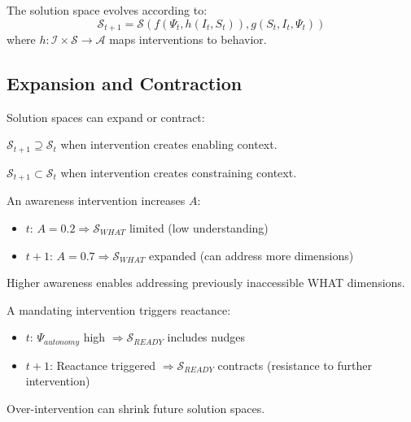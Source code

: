 \begin{theorem}
The solution space evolves according to:
\begin{equation}
\mathcal{S}_{t+1} = \mathcal{S}\left(f(\Psi_t, h(I_t, S_t)), g(S_t, I_t, \Psi_t)\right)
\end{equation}
where $h: \mathcal{I} \times \mathcal{S} \to \mathcal{A}$ maps interventions to behavior.
\end{theorem}

\subsection{Expansion and Contraction}

Solution spaces can expand or contract:

\begin{definition}
$\mathcal{S}_{t+1} \supseteq \mathcal{S}_t$ when intervention creates enabling context.
\end{definition}

\begin{definition}
$\mathcal{S}_{t+1} \subset \mathcal{S}_t$ when intervention creates constraining context.
\end{definition}

\begin{example}
An awareness intervention increases $A$:
\begin{itemize}
    \item $t$: $A = 0.2 \Rightarrow \mathcal{S}_{WHAT}$ limited (low understanding)
    \item $t+1$: $A = 0.7 \Rightarrow \mathcal{S}_{WHAT}$ expanded (can address more dimensions)
\end{itemize}
Higher awareness enables addressing previously inaccessible WHAT dimensions.
\end{example}

\begin{example}
A mandating intervention triggers reactance:
\begin{itemize}
    \item $t$: $\Psi_{autonomy}$ high $\Rightarrow \mathcal{S}_{READY}$ includes nudges
    \item $t+1$: Reactance triggered $\Rightarrow \mathcal{S}_{READY}$ contracts (resistance to further intervention)
\end{itemize}
Over-intervention can shrink future solution spaces.
\end{example}

